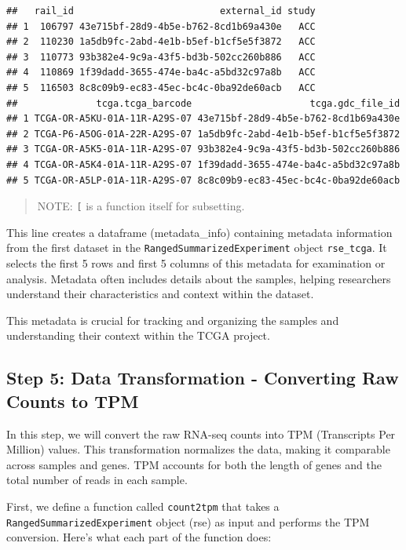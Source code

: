 \documentclass[
]{book}
\begin{document}
\begin{verbatim}
##   rail_id                          external_id study
## 1  106797 43e715bf-28d9-4b5e-b762-8cd1b69a430e   ACC
## 2  110230 1a5db9fc-2abd-4e1b-b5ef-b1cf5e5f3872   ACC
## 3  110773 93b382e4-9c9a-43f5-bd3b-502cc260b886   ACC
## 4  110869 1f39dadd-3655-474e-ba4c-a5bd32c97a8b   ACC
## 5  116503 8c8c09b9-ec83-45ec-bc4c-0ba92de60acb   ACC
##              tcga.tcga_barcode                     tcga.gdc_file_id
## 1 TCGA-OR-A5KU-01A-11R-A29S-07 43e715bf-28d9-4b5e-b762-8cd1b69a430e
## 2 TCGA-P6-A5OG-01A-22R-A29S-07 1a5db9fc-2abd-4e1b-b5ef-b1cf5e5f3872
## 3 TCGA-OR-A5K5-01A-11R-A29S-07 93b382e4-9c9a-43f5-bd3b-502cc260b886
## 4 TCGA-OR-A5K4-01A-11R-A29S-07 1f39dadd-3655-474e-ba4c-a5bd32c97a8b
## 5 TCGA-OR-A5LP-01A-11R-A29S-07 8c8c09b9-ec83-45ec-bc4c-0ba92de60acb
\end{verbatim}

\begin{quote}
NOTE: \texttt{{[}} is a function itself for subsetting.
\end{quote}

This line creates a dataframe (metadata\_info) containing metadata information from the first dataset in the \texttt{RangedSummarizedExperiment} object \texttt{rse\_tcga}. It selects the first 5 rows and first 5 columns of this metadata for examination or analysis. Metadata often includes details about the samples, helping researchers understand their characteristics and context within the dataset.

This metadata is crucial for tracking and organizing the samples and understanding their context within the TCGA project.

\hypertarget{step-5-data-transformation---converting-raw-counts-to-tpm}{%
\subsection{Step 5: Data Transformation - Converting Raw Counts to TPM}\label{step-5-data-transformation---converting-raw-counts-to-tpm}}

In this step, we will convert the raw RNA-seq counts into TPM (Transcripts Per Million) values. This transformation normalizes the data, making it comparable across samples and genes. TPM accounts for both the length of genes and the total number of reads in each sample.

First, we define a function called \texttt{count2tpm} that takes a \texttt{RangedSummarizedExperiment} object (rse) as input and performs the TPM conversion. Here's what each part of the function does:
\end{document}
